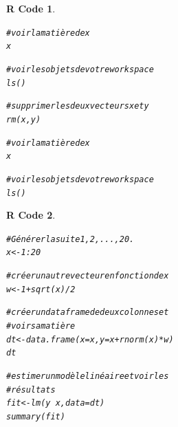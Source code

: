 \documentclass[11pt]{beamer}\usepackage[]{graphicx}\usepackage[]{color}
\makeatletter
\newcommand{\hlnum}[1]{\textcolor[rgb]{0.063,0.58,0.627}{#1}}%
\newcommand{\hlcom}[1]{\textcolor[rgb]{0.588,0.588,0.588}{#1}}%
\newcommand{\hlopt}[1]{\textcolor[rgb]{0.196,0.196,0.196}{#1}}%
\newcommand{\hlstd}[1]{\textcolor[rgb]{0.196,0.196,0.196}{#1}}%
\newcommand{\hlkwb}[1]{\textcolor[rgb]{0.627,0,0.314}{#1}}%
\newcommand{\hlkwc}[1]{\textcolor[rgb]{0,0.631,0.314}{#1}}%
\newcommand{\hlkwd}[1]{\textcolor[rgb]{0.78,0.227,0.412}{#1}}%
\newenvironment{kframe}{%
 \def\at@end@of@kframe{}%
 \ifinner\ifhmode%
  \def\at@end@of@kframe{\end{minipage}}%
  \begin{minipage}{\columnwidth}%
 \fi\fi%
 \def\FrameCommand##1{\hskip\@totalleftmargin \hskip-\fboxsep
 \colorbox{shadecolor}{##1}\hskip-\fboxsep
     \hskip-\linewidth \hskip-\@totalleftmargin \hskip\columnwidth}%
 \MakeFramed {\advance\hsize-\width
   \@totalleftmargin\z@ \linewidth\hsize
   \@setminipage}}%
 {\par\unskip\endMakeFramed%
 \at@end@of@kframe}
\newenvironment{knitrout}{}{} %
\newtheorem{rcode}{R Code}[section]
\makeatother
\begin{document}
\begin{frame}
\begin{knitrout}
\color{fgcolor}\begin{kframe}
\begin{rcode}\label{unnamed-chunk-4}\hfill{}\begin{alltt}
\hlcom{# voir la matière de x}
\hlstd{x}

\hlcom{# voir les objets de votre workspace}
\hlkwd{ls}\hlstd{()}

\hlcom{# supprimer les deux vecteurs x et y}
\hlkwd{rm}\hlstd{(x,y)}

\hlcom{# voir la matière de x}
\hlstd{x}

\hlcom{# voir les objets de votre workspace}
\hlkwd{ls}\hlstd{()}
\end{alltt}
\end{rcode}\end{kframe}
\end{knitrout}
\end{frame}


\begin{frame}
\begin{knitrout}
\color{fgcolor}\begin{kframe}
\begin{rcode}\label{unnamed-chunk-5}\hfill{}\begin{alltt}
\hlcom{# Générer la suite 1, 2, ..., 20.}
\hlstd{x} \hlkwb{<-} \hlnum{1}\hlopt{:}\hlnum{20}

\hlcom{# créer un autre vecteur en fonction de x}
\hlstd{w} \hlkwb{<-} \hlnum{1} \hlopt{+} \hlkwd{sqrt}\hlstd{(x)}\hlopt{/}\hlnum{2}

\hlcom{# créer un data frame de deux colonnes et}
\hlcom{# voir sa matière }
\hlstd{dt} \hlkwb{<-} \hlkwd{data.frame}\hlstd{(}\hlkwc{x} \hlstd{= x,} \hlkwc{y} \hlstd{= x} \hlopt{+} \hlkwd{rnorm}\hlstd{(x)}\hlopt{*}\hlstd{w)}
\hlstd{dt}

\hlcom{# estimer un modèle linéaire et voir les}
\hlcom{# résultats}
\hlstd{fit} \hlkwb{<-} \hlkwd{lm}\hlstd{(y} \hlopt{~} \hlstd{x,} \hlkwc{data} \hlstd{= dt)}
\hlkwd{summary}\hlstd{(fit)}
\end{alltt}
\end{rcode}\end{kframe}
\end{knitrout}


\end{frame}
\end{document}
